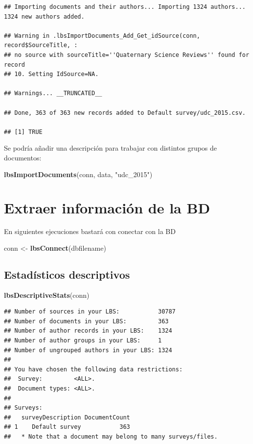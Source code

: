 \documentclass[]{book}
\newenvironment{Shaded}{\begin{snugshade}}{\end{snugshade}}
\newcommand{\KeywordTok}[1]{\textcolor[rgb]{0.13,0.29,0.53}{\textbf{#1}}}
\newcommand{\StringTok}[1]{\textcolor[rgb]{0.31,0.60,0.02}{#1}}
\newcommand{\NormalTok}[1]{#1}
\begin{document}
\begin{verbatim}
## Importing documents and their authors... Importing 1324 authors... 1324 new authors added.

## Warning in .lbsImportDocuments_Add_Get_idSource(conn, record$SourceTitle, :
## no source with sourceTitle=''Quaternary Science Reviews'' found for record
## 10. Setting IdSource=NA.

## Warnings... __TRUNCATED__

## Done, 363 of 363 new records added to Default survey/udc_2015.csv.

## [1] TRUE
\end{verbatim}

Se podría añadir una descripción para trabajar con distintos grupos de
documentos:

\begin{Shaded}
\begin{Highlighting}[]
\KeywordTok{lbsImportDocuments}\NormalTok{(conn, data, }\StringTok{"udc_2015"}\NormalTok{) }
\end{Highlighting}
\end{Shaded}

\section{Extraer información de la
BD}\label{extraer-informaciuxf3n-de-la-bd}

En siguientes ejecuciones bastará con conectar con la BD

\begin{Shaded}
\begin{Highlighting}[]
\NormalTok{conn <-}\StringTok{ }\KeywordTok{lbsConnect}\NormalTok{(dbfilename)}
\end{Highlighting}
\end{Shaded}

\subsection{Estadísticos
descriptivos}\label{estaduxedsticos-descriptivos}

\begin{Shaded}
\begin{Highlighting}[]
\KeywordTok{lbsDescriptiveStats}\NormalTok{(conn)}
\end{Highlighting}
\end{Shaded}

\begin{verbatim}
## Number of sources in your LBS:           30787
## Number of documents in your LBS:         363
## Number of author records in your LBS:    1324
## Number of author groups in your LBS:     1
## Number of ungrouped authors in your LBS: 1324
## 
## You have chosen the following data restrictions:
##  Survey:         <ALL>.
##  Document types: <ALL>.
## 
## Surveys:
##   surveyDescription DocumentCount
## 1    Default survey           363
##   * Note that a document may belong to many surveys/files.
\end{verbatim}
\end{document}
